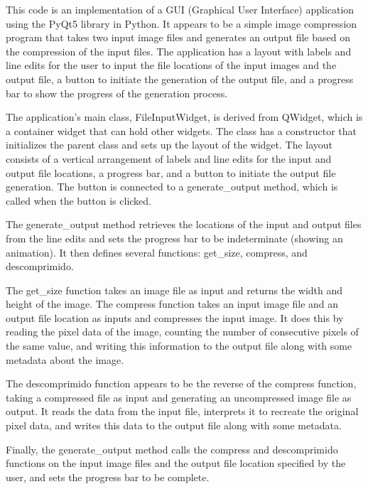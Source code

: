 This code is an implementation of a GUI (Graphical User Interface) application using the PyQt5 library in Python. It appears to be a simple image compression program that takes two input image files and generates an output file based on the compression of the input files. The application has a layout with labels and line edits for the user to input the file locations of the input images and the output file, a button to initiate the generation of the output file, and a progress bar to show the progress of the generation process.

The application's main class, FileInputWidget, is derived from QWidget, which is a container widget that can hold other widgets. The class has a constructor that initializes the parent class and sets up the layout of the widget. The layout consists of a vertical arrangement of labels and line edits for the input and output file locations, a progress bar, and a button to initiate the output file generation. The button is connected to a generate_output method, which is called when the button is clicked.

The generate_output method retrieves the locations of the input and output files from the line edits and sets the progress bar to be indeterminate (showing an animation). It then defines several functions: get_size, compress, and descomprimido.

The get_size function takes an image file as input and returns the width and height of the image. The compress function takes an input image file and an output file location as inputs and compresses the input image. It does this by reading the pixel data of the image, counting the number of consecutive pixels of the same value, and writing this information to the output file along with some metadata about the image.

The descomprimido function appears to be the reverse of the compress function, taking a compressed file as input and generating an uncompressed image file as output. It reads the data from the input file, interprets it to recreate the original pixel data, and writes this data to the output file along with some metadata.

Finally, the generate_output method calls the compress and descomprimido functions on the input image files and the output file location specified by the user, and sets the progress bar to be complete.